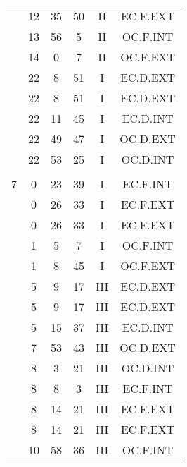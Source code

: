 \documentclass[12pt, a4paper]{article}
\begin{document}
\begin{multicols}{3}
{\begin{tabular}{c c c c c c}
	 	 	 	 & 12 & 35 & 50 & II & EC.F.EXT\\%
	 	 	 	 & 13 & 56 & 5 & II & OC.F.INT\\%
	 	 	 	 & 14 & 0 & 7 & II & OC.F.EXT\\%
	 	 	 	 & 22 & 8 & 51 & I & EC.D.EXT\\%
	 	 	 	 & 22 & 8 & 51 & I & EC.D.EXT\\%
	 	 	 	 & 22 & 11 & 45 & I & EC.D.INT\\%
	 	 	 	 & 22 & 49 & 47 & I & OC.D.EXT\\%
	 	 	 	 & 22 & 53 & 25 & I & OC.D.INT\\%
	 	 	 	 & & & & & \\%
	 	 	 	7 & 0 & 23 & 39 & I & EC.F.INT\\%
	 	 	 	 & 0 & 26 & 33 & I & EC.F.EXT\\%
	 	 	 	 & 0 & 26 & 33 & I & EC.F.EXT\\%
	 	 	 	 & 1 & 5 & 7 & I & OC.F.INT\\%
	 	 	 	 & 1 & 8 & 45 & I & OC.F.EXT\\%
	 	 	 	 & 5 & 9 & 17 & III & EC.D.EXT\\%
	 	 	 	 & 5 & 9 & 17 & III & EC.D.EXT\\%
	 	 	 	 & 5 & 15 & 37 & III & EC.D.INT\\%
	 	 	 	 & 7 & 53 & 43 & III & OC.D.EXT\\%
	 	 	 	 & 8 & 3 & 21 & III & OC.D.INT\\%
	 	 	 	 & 8 & 8 & 3 & III & EC.F.INT\\%
	 	 	 	 & 8 & 14 & 21 & III & EC.F.EXT\\%
	 	 	 	 & 8 & 14 & 21 & III & EC.F.EXT\\%
	 	 	 	 & 10 & 58 & 36 & III & OC.F.INT\\%

\end{tabular}}
\end{multicols}
\end{document}
